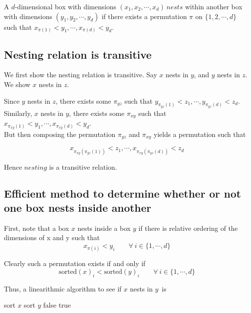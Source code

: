 \documentclass[paper=a4, fontsize=11pt]{scrartcl} %
\numberwithin{equation}{section} %
\numberwithin{figure}{section} %
\numberwithin{table}{section} %
\begin{document}
A $d$-dimensional box with dimensions $(x_1, x_2, \cdots, x_d)~nests$ within another box with dimensions $(y_1, y_2, \cdots, y_d)$ if there exists a permutation $\pi$ on $\{1, 2, \cdots, d\}$ such that $x_{\pi(1)} < y_1, \cdots, x_{\pi(d)} < y_d$.

\subsection{Nesting relation is transitive}

We first show the nesting relation is transitive. Say $x$ nests in $y$, and $y$ nests in $z$. We show $x$ nests in $z$.

Since $y$ nests in $z$, there exists some $\pi_{yz}$ such that $y_{\pi_{yz}(1)} < z_1, \cdots, y_{\pi_{yz}(d)} < z_d$. \\

Similarly, $x$ nests in $y$, there exists some $\pi_{xy}$ such that $x_{\pi_{xy}(1)} < y_1, \cdots, x_{\pi_{xy}(d)} < y_d$. \\

But then composing the permutation $\pi_{yz}$ and $\pi_{xy}$ yields a permutation such that

\[x_{\pi_{xy}\left(\pi_{yz}(1)\right)} < z_1, \cdots, x_{\pi_{xy}\left(\pi_{yz}(d)\right)} < z_d\]

Hence $nesting$ is a transitive relation.

\subsection{Efficient method to determine whether or not one box nests inside another}

First, note that a box $x$ nests inside a box $y$ if there is relative ordering of the dimensions of x and y such that
\[x_{\pi(i)} < y_i \qquad{} \forall ~ i \in \{1, \cdots, d\}\]

Clearly such a permutation exists if and only if
\[\textrm{sorted}(x)_{i} < \textrm{sorted}(y)_{i} \qquad{} \forall ~ i \in \{1, \cdots, d\}\]

Thus, a linearithmic algorithm to see if $x$ nests in $y$\ is \\

\begin{algorithmic}
	\State sort $x$ 
	\State sort $y$
			\State \Return false 
		\EndIf
	\EndFor
	\State \Return true
	\EndFunction
\end{algorithmic}
\end{document}

